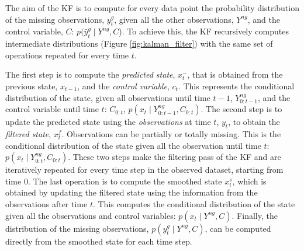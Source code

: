 \documentclass{article}
\begin{document}
The aim of the KF is to compute for every data point the probability distribution of the missing observations, $y^g_t$, given all the other observations, $Y^{ng}$, and the control variable, $C$: $p(\hat{y}^g_t \mid Y^{ng}, C$). To achieve this, the KF recursively computes intermediate distributions (Figure \ref{fig:kalman_filter}) with the same set of operations repeated for every time $t$.

The first step is to compute the \textit{predicted state}, $x^-_t$, that is obtained from the previous state, $x_{t-1}$, and the \textit{control variable}, $c_t$. This represents the conditional distribution of the state, given all observations until time $t-1$, $Y^{ng}_{0:t-1}$, and the control variable until time $t$: $C_{0:t}$, $p(x_t \mid Y^{ng}_{0:t-1}, C_{0:t})$.
The second step is to update the predicted state using the \textit{observations} at time $t$, $y_t$, to obtain the \textit{filtered state}, $x^f_t$. Observations can be partially or totally missing. This is the conditional distribution of the state given all the observation until time $t$: $p(x_t \mid Y^{ng}_{0:t}, C_{0:t})$.
These two steps make the filtering pass of the KF and are iteratively repeated for every time step in the observed dataset, starting from time $0$.
The last operation is to compute the smoothed state $x^s_t$, which is obtained by updating the filtered state using the information from the observations after time $t$. This computes the conditional distribution of the state given all the observations and control variables: $p(x_t \mid Y^{ng}, C)$.
Finally, the distribution of the missing observations, $p(y^g_t \mid Y^{ng}, C)$, can be computed directly from the smoothed state for each time step.
\end{document}
